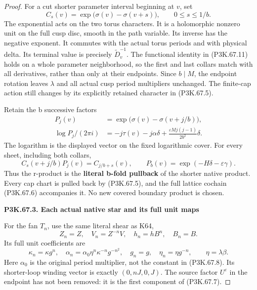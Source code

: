 \begin{proof}
For a cut shorter parameter interval beginning at \(v\), set
\[
 C_s(v)=\exp\bigl(\sigma(v)-\sigma(v+s)\bigr),
      \qquad 0\le s\le1/b.
 \tag{P3K.67.12}
\]
The exponential acts on the two torus characters. It is a holomorphic
nonzero unit on the full cusp disc, smooth in the path variable. Its
inverse has the negative exponent. It commutes with the actual torus
periods and with physical delta. Its terminal value is precisely
\(\widetilde D_v^{-1}\). The functional identity in (P3K.67.11) holds
on a whole parameter neighborhood, so the first and last collars
match with all derivatives, rather than only at their endpoints.
Since \(b\mid M\), the endpoint rotation leaves \(\lambda\) and
all actual cusp period multipliers unchanged. The finite-cap action
still changes by its explicitly retained character in (P3K.67.5).

Retain the b successive factors
\[
 \begin{aligned}
 P_j(v)&=\exp\bigl(\sigma(v)-\sigma(v+j/b)\bigr),\\
 \log P_j/(2\pi i)
   &=-j\tau(v)-j\alpha\delta
           +\frac{\varepsilon Mj(j-1)}{2b^2}\delta.
 \end{aligned}
 \tag{P3K.67.13}
\]
The logarithm is the displayed vector on the fixed logarithmic cover.
For every sheet, including both collars,
\[
 C_s(v+j/b)P_j(v)=C_{j/b+s}(v),\qquad
 P_b(v)=\exp(-H\delta-\varepsilon\gamma).
 \tag{P3K.67.14}
\]
Thus the r-product is the \textbf{literal b-fold pullback} of the shorter
native product. Every cap chart is pulled back by (P3K.67.5), and the
full lattice cochain (P3K.67.6) accompanies it. No new covered boundary
product is chosen.

\par

\medskip\noindent\textbf{P3K.67.3. Each actual native star and its full unit maps}

\par\nobreak

For the fan \(T_n\), use the same literal shear as K64,
\[
 Z_n=Z,\quad V_n=Z^{-n}V,\quad h_n=hB^n,\quad B_n=B.
\]
Its full unit coefficients are
\[
 \kappa_n=\kappa g^n,\quad
 \alpha_n=\alpha_0\eta^n\kappa^{-n}g^{-n^2},\quad
 g_n=g,\quad\eta_n=\eta g^{-n},\qquad \eta=\lambda\beta.
 \tag{P3K.67.15}
\]
Here \(\alpha_0\) is the original period multiplier, not the constant
in (P3K.67.8). Its shorter-loop winding vector is exactly
\((0,nJ,0,J)\). The source factor \(U^\varepsilon\) in the endpoint
has not been removed: it is the first component of (P3K.67.7).


\end{proof}
